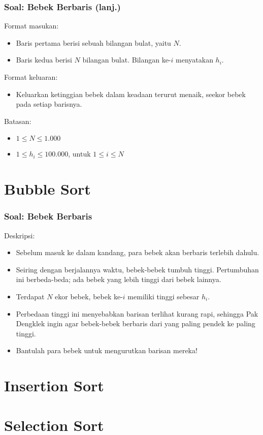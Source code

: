 \documentclass{beamer}
\begin{document}
\begin{frame}
\frametitle{Soal: Bebek Berbaris (lanj.)}
Format masukan:
\begin{itemize}
	\item Baris pertama berisi sebuah bilangan bulat, yaitu $N$.
	\item Baris kedua berisi $N$ bilangan bulat. Bilangan ke-$i$ menyatakan $h_i$.
\end{itemize}
Format keluaran:
\begin{itemize}
	\item Keluarkan ketinggian bebek dalam keadaan terurut menaik, seekor bebek pada setiap barisnya.
\end{itemize}
Batasan:
\begin{itemize}
	\item $1 \le N \le 1.000$
	\item $1 \le h_i \le 100.000$, untuk $1 \le i \le N$
\end{itemize}
\end{frame}

\section{Bubble Sort}
\frame{\sectionpage}

\begin{frame}
\frametitle{Soal: Bebek Berbaris}
Deskripsi:
\begin{itemize}
	\item Sebelum masuk ke dalam kandang, para bebek akan berbaris terlebih dahulu.
	\item Seiring dengan berjalannya waktu, bebek-bebek tumbuh tinggi. Pertumbuhan ini berbeda-beda; ada bebek yang lebih tinggi dari bebek lainnya.
	\item Terdapat $N$ ekor bebek, bebek ke-$i$ memiliki tinggi sebesar $h_i$.
	\item Perbedaan tinggi ini menyebabkan barisan terlihat kurang rapi, sehingga Pak Dengklek ingin agar bebek-bebek berbaris dari yang paling pendek ke paling tinggi.
	\item Bantulah para bebek untuk mengurutkan barisan mereka!
\end{itemize}
\end{frame}

\section{Insertion Sort}
\frame{\sectionpage}

\section{Selection Sort}
\frame{\sectionpage}
\end{document}
